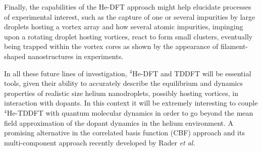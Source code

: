 		Finally, the capabilities of the He-DFT approach might help elucidate processes of experimental interest, such as the capture of one or several impurities by large droplets hosting a vortex array and how several atomic impurities, impinging upon a rotating droplet hosting vortices, react to form small clusters, eventually being trapped within the vortex cores as shown by the appearance of filament-shaped nanostructures in experiments.

		In all these future lines of investigation, $^4$He-DFT and TDDFT will be essential tools, given their ability to accurately describe the equilibrium and dynamics properties of realistic size helium nanodroplets, possibly hosting vortices, in interaction with dopants. In this context it will be extremely interesting to couple $^4$He-TDDFT with quantum molecular dynamics in order to go beyond the mean field approximation of the dopant dynamics in the helium environment. A promising alternative in the correlated basis function (CBF) approach and its multi-component approach recently developed by Rader \textit{et al.}\citep{Rader2017}
\clearpage{\pagestyle{empty}\cleardoublepage}